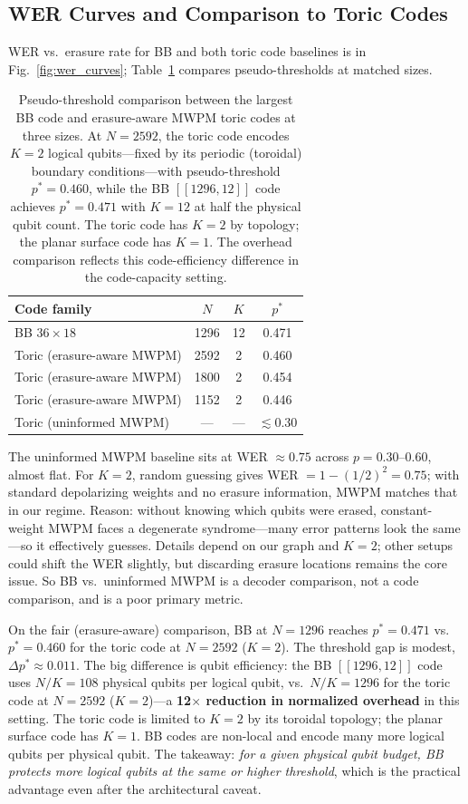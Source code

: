 \documentclass[twocolumn,10pt]{article}
\begin{document}
\subsection{WER Curves and Comparison to Toric Codes}

WER vs.\ erasure rate for BB and both toric code baselines is in Fig.~\ref{fig:wer_curves};
Table~\ref{tab:baseline} compares pseudo-thresholds at matched sizes.

\begin{table}[h]
\centering
\caption{Pseudo-threshold comparison between the largest BB code and erasure-aware MWPM toric
codes at three sizes.
At $N=2592$, the toric code encodes $K=2$ logical qubits---fixed by its periodic (toroidal)
boundary conditions---with pseudo-threshold $p^*=0.460$, while the BB $[[1296,12]]$ code achieves
$p^*=0.471$ with $K=12$ at half the physical qubit count.
The toric code has $K=2$ by topology; the planar surface code has $K=1$.
The overhead comparison reflects this code-efficiency difference in the code-capacity setting.}
\label{tab:baseline}
\begin{tabular}{lccc}
\toprule
Code family & $N$ & $K$ & $p^*$ \\
\midrule
BB $36{\times}18$ & 1296 & 12 & 0.471 \\
Toric (erasure-aware MWPM) & 2592 & 2 & 0.460 \\
Toric (erasure-aware MWPM) & 1800 & 2 & 0.454 \\
Toric (erasure-aware MWPM) & 1152 & 2 & 0.446 \\
Toric (uninformed MWPM)   & --- & --- & ${\lesssim}0.30$ \\
\bottomrule
\end{tabular}
\end{table}

The uninformed MWPM baseline sits at WER $\approx 0.75$ across $p = 0.30$--$0.60$, almost
flat.
For $K=2$, random guessing gives WER $= 1 - (1/2)^2 = 0.75$; with standard depolarizing
weights and no erasure information, MWPM matches that in our regime.
Reason: without knowing which qubits were erased, constant-weight MWPM faces a degenerate
syndrome---many error patterns look the same---so it effectively guesses.
Details depend on our graph and $K=2$; other setups could shift the WER slightly, but
discarding erasure locations remains the core issue.
So BB vs.\ uninformed MWPM is a decoder comparison, not a code comparison, and is a poor
primary metric.

On the fair (erasure-aware) comparison, BB at $N=1296$ reaches $p^* = 0.471$ vs.\
$p^* = 0.460$ for the toric code at $N=2592$ ($K=2$).
The threshold gap is modest, $\Delta p^* \approx 0.011$.
The big difference is qubit efficiency: the BB $[[1296,12]]$ code uses $N/K = 108$ physical
qubits per logical qubit, vs.\ $N/K = 1296$ for the toric code at $N=2592$ ($K=2$)---a
\textbf{12$\times$ reduction in normalized overhead} in this setting.
The toric code is limited to $K=2$ by its toroidal topology; the planar surface code has $K=1$.
BB codes are non-local and encode many more logical qubits per physical qubit.
The takeaway: \emph{for a given physical qubit budget, BB protects more logical qubits at
the same or higher threshold}, which is the practical advantage even after the architectural
caveat.
\end{document}
